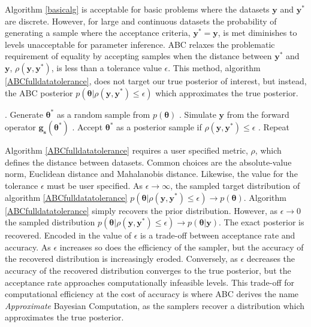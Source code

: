 Algorithm \ref{basicalg} is acceptable for basic problems where the datasets $\bm{y}$ and $\bm{y^*}$ are discrete. However, for large and continuous datasets the probability of generating a sample where the acceptance criteria, $\bm{y^*} = \bm{y}$, is met diminishes to levels unacceptable for parameter inference. ABC relaxes the problematic requirement of equality by accepting samples when the distance between $\bm{y^*}$ and $\bm{y}$, $\rho(\bm{y},\bm{y^*})$, is less than a tolerance value $\epsilon$. This method, algorithm \ref{ABCfulldatatolerance}, does not target our true posterior of interest, but instead, the ABC posterior $p(\bm{\theta}|\rho(\bm{y},\bm{y^*})\leq\epsilon)$ which approximates the true posterior. 

\begin{algorithm}[H]
	\caption{ }
	\begin{algorithmic}
		. Generate $\bm{\theta^*}$ as a random sample from $p(\bm{\theta})$		
		. Simulate $\bm{y}$ from the forward operator $\bm{g_s}(\bm{\theta^*})$		
		. Accept $\bm{\theta^*}$ as a posterior sample if $\rho(\bm{y},\bm{y^*})\leq\epsilon$		
		. Repeat
	\end{algorithmic}
	\label{ABCfulldatatolerance}
\end{algorithm}

Algorithm \ref{ABCfulldatatolerance} requires a user specified metric, $\rho$, which defines the distance between datasets. Common choices are the absolute-value norm, Euclidean distance and Mahalanobis distance. Likewise, the value for the tolerance $\epsilon$ must be user specified. As $\epsilon \rightarrow \infty$, the sampled target distribution of algorithm \ref{ABCfulldatatolerance} $p(\bm{\theta}|\rho(\bm{y},\bm{y^*})\leq\epsilon) \rightarrow p(\bm{\theta})$.  Algorithm \ref{ABCfulldatatolerance} simply recovers the prior distribution. However, as $\epsilon \rightarrow 0$ the sampled distribution $p(\bm{\theta}|\rho(\bm{y},\bm{y^*})\leq\epsilon) \rightarrow p(\bm{\theta}|\bm{y})$. The exact posterior is recovered. Encoded in the value of $\epsilon$ is a trade-off between acceptance rate and accuracy. As $\epsilon$ increases so does the efficiency of the sampler, but the accuracy of the recovered distribution is increasingly eroded. Conversely, as $\epsilon$ decreases the accuracy of the recovered distribution converges to the true posterior, but the acceptance rate approaches computationally infeasible levels. This trade-off for computational efficiency at the cost of accuracy is where ABC derives the name \textit{Approximate} Bayesian Computation, as the samplers recover a distribution which approximates the true posterior.\\

